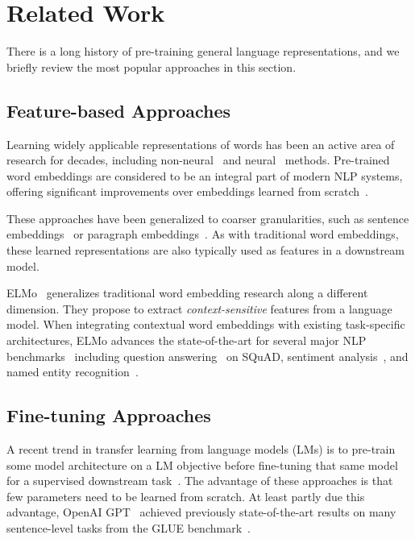 \section{Related Work}
There is a long history of pre-training general language representations, and we briefly review the most popular approaches in this section.
\subsection{Feature-based Approaches}
Learning widely applicable representations of words has been an active area of research for decades, including non-neural~\cite{brown-etal:1992:_class,ando-zhang:2005, blitzer-mcdonald-pereira:2006:_domain} and neural~\cite{collobert-weston:2008, mikolov-etal:2013, pennington-socher-manning:2014:_glove} methods. Pre-trained word embeddings are considered to be an integral part of modern NLP systems, offering significant improvements over embeddings learned from scratch~\cite{turian-ratinov-bengio:2010:_word_repres}.

These approaches have been generalized to coarser granularities, such as sentence embeddings~\cite{kiros-etal:2015:_skip, logeswaran2018an} or paragraph embeddings~\cite{le-mikolov:2014:_distr}. As with traditional word embeddings, these learned representations are also typically used as features in a downstream model.

ELMo~\cite{peters-etal:2017:_semi} generalizes traditional word embedding research along a different dimension. They propose to extract \emph{context-sensitive} features from a language model. When integrating contextual word embeddings with existing task-specific architectures, ELMo advances the state-of-the-art for several major NLP benchmarks~\cite{peters-etal:2018:_deep} including question answering~\cite{rajpurkar-etal:2016:_squad} on SQuAD, sentiment analysis~\cite{socher-etal:2013:_recur}, and named entity recognition~\cite{tjong-de:2003}.

\subsection{Fine-tuning Approaches}
A recent trend in transfer learning from language models (LMs) is to pre-train some model architecture on a LM objective before fine-tuning that same model for a supervised downstream task~\cite{dai-le:2015:_semi, howard-ruder:2018, radford-etal:2018}. The advantage of these approaches is that few parameters need to be learned from scratch. At least partly due this advantage, OpenAI GPT~\cite{radford-etal:2018} achieved previously state-of-the-art results on many sentence-level tasks from the GLUE benchmark~\cite{wang-etal:2018:_glue}.

